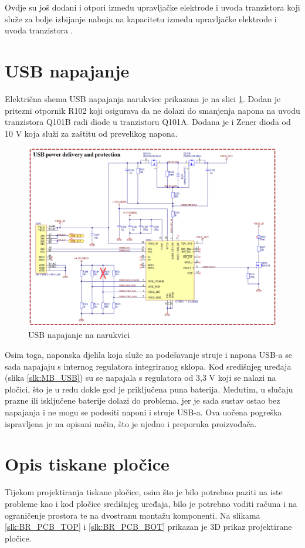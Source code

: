 Ovdje su još dodani i otpori između upravljačke elektrode i uvoda tranzistora koji služe za bolje izbijanje naboja na kapacitetu između upravljačke elektrode i uvoda tranzistora \cite{ti:bq29700}.

\section{USB napajanje}
\label{sec:BR_USB}
Električna shema USB napajanja narukvice prikazana je na slici \ref{slk:BR_USB}. Dodan je pritezni otpornik R102 koji osigurava da ne dolazi do smanjenja napona na uvodu tranzistora Q101B radi diode u tranzistoru Q101A. Dodana je i Zener dioda od 10 V koja služi za zaštitu od prevelikog napona.
\begin{figure}[!htbp]
    \centering
    \includegraphics[width=\textwidth]{Figures/BR_USB.png}
    \caption{USB napajanje na narukvici}
    \label{slk:BR_USB}
\end{figure}

Osim toga, naponska djelila koja služe za podešavanje struje i napona USB-a se sada napajaju s internog regulatora integriranog sklopa. Kod središnjeg uređaja (slika \ref{slk:MB_USB}) su se napajala s regulatora od 3,3 V koji se nalazi na pločici, što je u redu dokle god je priključena puna baterija. Međutim, u slučaju prazne ili isključene baterije dolazi do problema, jer je sada sustav ostao bez napajanja i ne mogu se podesiti naponi i struje USB-a. Ova uočena pogreška ispravljena je na opisani način, što je ujedno i preporuka proizvođača.

\section{Opis tiskane pločice}
Tijekom projektiranja tiskane pločice, osim što je bilo potrebno paziti na iste probleme kao i kod pločice središnjeg uređaja, bilo je potrebno voditi računa i na ograničenje prostora te na dvostranu montažu komponenti. Na slikama \ref{slk:BR_PCB_TOP} i \ref{slk:BR_PCB_BOT} prikazan je 3D prikaz projektirane pločice.

